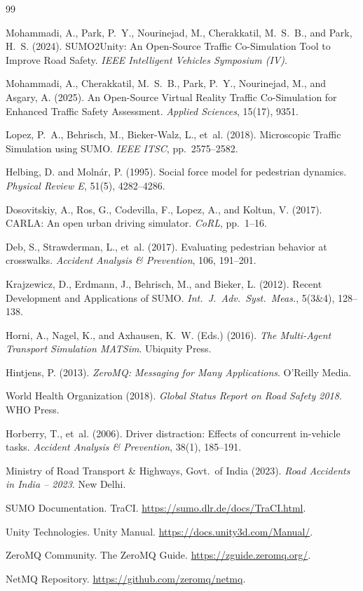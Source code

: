 \documentclass[12pt,a4paper,oneside]{report}
\begin{document}
\renewcommand{\bibname}{References}
\begin{thebibliography}{99}
\setlength{\itemsep}{6pt}

Mohammadi, A., Park, P.~Y., Nourinejad, M., Cherakkatil, M.~S.~B., and Park, H.~S. (2024).
SUMO2Unity: An Open-Source Traffic Co-Simulation Tool to Improve Road Safety.
\textit{IEEE Intelligent Vehicles Symposium (IV)}.

Mohammadi, A., Cherakkatil, M.~S.~B., Park, P.~Y., Nourinejad, M., and Asgary, A. (2025).
An Open-Source Virtual Reality Traffic Co-Simulation for Enhanced Traffic Safety Assessment.
\textit{Applied Sciences}, 15(17), 9351.

Lopez, P.~A., Behrisch, M., Bieker-Walz, L., et~al. (2018).
Microscopic Traffic Simulation using SUMO.
\textit{IEEE ITSC}, pp.~2575--2582.

Helbing, D. and Moln\'{a}r, P. (1995).
Social force model for pedestrian dynamics.
\textit{Physical Review E}, 51(5), 4282--4286.

Dosovitskiy, A., Ros, G., Codevilla, F., Lopez, A., and Koltun, V. (2017).
CARLA: An open urban driving simulator.
\textit{CoRL}, pp.~1--16.

Deb, S., Strawderman, L., et~al. (2017).
Evaluating pedestrian behavior at crosswalks.
\textit{Accident Analysis \& Prevention}, 106, 191--201.

Krajzewicz, D., Erdmann, J., Behrisch, M., and Bieker, L. (2012).
Recent Development and Applications of SUMO.
\textit{Int.\ J.\ Adv.\ Syst.\ Meas.}, 5(3\&4), 128--138.

Horni, A., Nagel, K., and Axhausen, K.~W. (Eds.) (2016).
\textit{The Multi-Agent Transport Simulation MATSim}. Ubiquity Press.

Hintjens, P. (2013).
\textit{ZeroMQ: Messaging for Many Applications}. O'Reilly Media.

World Health Organization (2018).
\textit{Global Status Report on Road Safety 2018}. WHO Press.

Horberry, T., et~al. (2006).
Driver distraction: Effects of concurrent in-vehicle tasks.
\textit{Accident Analysis \& Prevention}, 38(1), 185--191.

Ministry of Road Transport \& Highways, Govt.\ of India (2023).
\textit{Road Accidents in India -- 2023}. New Delhi.

SUMO Documentation. TraCI. \url{https://sumo.dlr.de/docs/TraCI.html}.

Unity Technologies. Unity Manual. \url{https://docs.unity3d.com/Manual/}.

ZeroMQ Community. The ZeroMQ Guide. \url{https://zguide.zeromq.org/}.

NetMQ Repository. \url{https://github.com/zeromq/netmq}.

\end{thebibliography}
\end{document}
